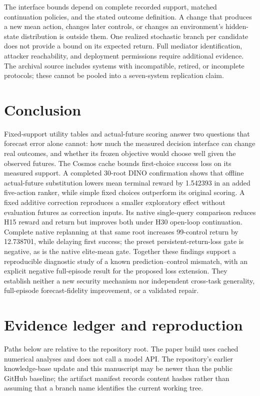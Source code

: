 \documentclass[11pt]{article}
\begin{document}
The interface bounds depend on complete recorded support, matched continuation
policies, and the stated outcome definition. A change that produces a new mean
action, changes later controls, or changes an environment's hidden-state
distribution is outside them. One realized stochastic branch per candidate
does not provide a bound on its expected return. Full mediator identification,
attacker reachability, and deployment permissions require additional evidence.
The archival source includes systems with incompatible, retired, or incomplete
protocols; these cannot be pooled into a seven-system replication claim.

\section{Conclusion}
Fixed-support utility tables and actual-future scoring answer two questions
that forecast error alone cannot: how much the measured decision interface can
change real outcomes, and whether its frozen objective would choose well given
the observed futures. The Cosmos cache bounds first-choice success loss on its
measured support. A completed 30-root DINO confirmation shows that offline
actual-future substitution lowers mean terminal reward by 1.542393 in an added
five-action ranker, while simple fixed choices outperform its original scoring.
A fixed additive correction reproduces a smaller exploratory effect without
evaluation futures as correction inputs. Its native single-query comparison
reduces H15 reward and return but improves both under H30 open-loop continuation.
Complete native replanning at that same root increases 99-control return by
12.738701, while delaying first success; the preset persistent-return-loss
gate is negative, as is the native elite-mean gate. Together these findings
support a reproducible diagnostic study of a known prediction--control mismatch,
with an explicit negative full-episode result for the proposed loss extension.
They establish neither a new security mechanism nor independent cross-task
generality, full-episode forecast-fidelity improvement, or a validated repair.




\appendix
\section{Evidence ledger and reproduction}
\label{sec:artifacts}
Paths below are relative to the repository root. The paper build uses cached
numerical analyses and does not call a model API. The repository's earlier
knowledge-base update and this manuscript may be newer than the public GitHub
baseline; the artifact manifest records content hashes rather than assuming
that a branch name identifies the current working tree.
\end{document}
